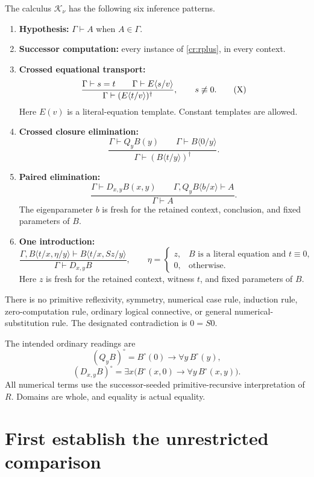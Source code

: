 \documentclass[11pt]{article}
\theoremstyle{definition}
\newcommand{\subc}[2]{#1\langle #2\rangle}
\newcommand{\lit}{\mathrel{\equiv}}
\newcommand{\Knorm}{\mathcal K_\nu}
\begin{document}
The calculus \(\Knorm\) has the following six inference patterns.

\begin{enumerate}[leftmargin=*]
\item \textbf{Hypothesis:} \(\Gamma\vdash A\) when \(A\in\Gamma\).
\item \textbf{Successor computation:} every instance of \eqref{cr:rplus}, in every context.
\item \textbf{Crossed equational transport:}
\[
\frac{\Gamma\vdash s=t\qquad
      \Gamma\vdash \subc E{s/v}}
     {\Gamma\vdash (\subc E{t/v})^\dagger},
\qquad s\not\lit0.
\tag{X}
\]
Here \(E(v)\) is a literal-equation template. Constant templates are allowed.
\item \textbf{Crossed closure elimination:}
\[
\frac{\Gamma\vdash Q_yB(y)\qquad\Gamma\vdash\subc B{0/y}}
     {\Gamma\vdash(\subc B{t/y})^\dagger}.
\tag{QX}
\]
\item \textbf{Paired elimination:}
\[
\frac{\Gamma\vdash D_{x,y}B(x,y)\qquad
      \Gamma,Q_y\subc B{b/x}\vdash A}
     {\Gamma\vdash A}.
\tag{DE}
\]
The eigenparameter \(b\) is fresh for the retained context, conclusion, and fixed parameters of \(B\).
\item \textbf{One introduction:}
\[
\frac{\Gamma,\subc B{t/x,\eta/y}
          \vdash\subc B{t/x,Sz/y}}
     {\Gamma\vdash D_{x,y}B},
\qquad
\eta=
\begin{cases}
z,&B\text{ is a literal equation and }t\lit0,\\
0,&\text{otherwise}.
\end{cases}
\tag{WI}
\]
Here \(z\) is fresh for the retained context, witness \(t\), and fixed parameters of \(B\).
\end{enumerate}

There is no primitive reflexivity, symmetry, numerical case rule, induction rule, zero-computation rule, ordinary logical connective, or general numerical-substitution rule. The designated contradiction is \(0=S0\).

The intended ordinary readings are
\[
(Q_yB)^\circ=B^\circ(0)\to\forall y\,B^\circ(y),
\]
\[
(D_{x,y}B)^\circ=
\exists x\bigl(B^\circ(x,0)\to\forall y\,B^\circ(x,y)\bigr).
\]
All numerical terms use the successor-seeded primitive-recursive interpretation of \(R\). Domains are whole, and equality is actual equality.

\section{First establish the unrestricted comparison}
\end{document}
